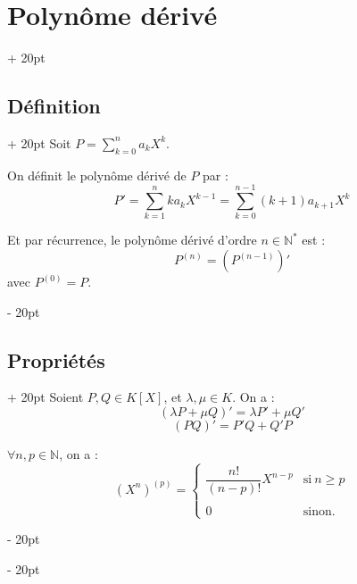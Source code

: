 \documentclass[a4paper, 12pt, twoside]{article}
\newcommand{\N}{\mathbb{N}} %
\newcommand{\lr}[1]{\left( #1 \right)}
\renewcommand{\ge}{\geqslant}
\newcommand{\ind}[1][20pt]{\advance\leftskip + #1}
\newcommand{\deind}[1][20pt]{\advance\leftskip - #1}
\newenvironment{indt}[2][20pt]{#2 \par \ind[#1]}{\par \deind} %
\begin{document}
    \vspace{12pt}
    
    \begin{indt}{\section{Polynôme dérivé}}
        
        \begin{indt}{\subsection{Définition}}
            Soit $\displaystyle P = \sum_{k = 0}^n a_k X^k$.
            
            \vspace{6pt}
            
            On définit le polynôme dérivé de $P$ par :
                \[ P' = \sum_{k = 1}^n k a_k X^{k - 1} = \sum_{k = 0}^{n - 1} (k + 1) a_{k + 1} X^k \]
            
            Et par récurrence, le polynôme dérivé d'ordre $n \in \N^*$ est :
                \[ P^{(n)} = \lr{P^{(n - 1)}}' \]
            avec $P^{(0)} = P$.
        \end{indt}
        
        \vspace{6pt}
        
        \begin{indt}{\subsection{Propriétés}}
            Soient $P, Q \in K[X]$, et $\lambda, \mu \in K$. On a :
                \[ (\lambda P + \mu Q)' = \lambda P' + \mu Q' \]
                \[ (PQ)' = P'Q + Q'P \]
            
            \vspace{6pt}
            
            $\forall n, p \in \N$, on a :
                \[
                (X^n)^{(p)} =
                \left\{ \!\!
                \begin{array}{ll}
                    \dfrac{n!}{(n - p)!} X^{n - p}
                    & \text{si}\ n \ge p
                    \\\\
                    0
                    & \text{sinon.}
                \end{array}
                \right.
                \]
            

\end{indt}
\end{indt}
\end{document}
